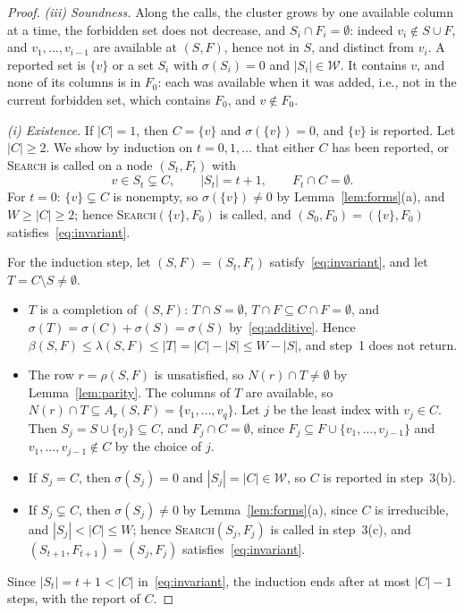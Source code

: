 \documentclass[11pt]{article}
\theoremstyle{definition}
\newcommand{\Wr}{\mathcal{W}}   %
\begin{document}
\begin{proof}
\emph{(iii) Soundness.} Along the calls, the cluster grows by one available column at a time, the forbidden set does
not decrease, and $S_i\cap F_i=\emptyset$: indeed $v_i\notin S\cup F$, and $v_1,\dots,v_{i-1}$ are available at
$(S,F)$, hence not in $S$, and distinct from $v_i$. A reported set is $\{v\}$ or a set $S_i$ with $\sigma(S_i)=0$ and
$|S_i|\in\Wr$. It contains $v$, and none of its columns is in $F_0$: each was available when it was added, i.e., not
in the current forbidden set, which contains $F_0$, and $v\notin F_0$.

\emph{(i) Existence.} If $|C|=1$, then $C=\{v\}$ and $\sigma(\{v\})=0$, and $\{v\}$ is reported. Let $|C|\ge2$. We
show by induction on $t=0,1,\dots$ that either $C$ has been reported, or \textup{\textsc{Search}} is called on a node
$(S_t,F_t)$ with
\begin{equation}\label{eq:invariant}
  v\in S_t\subsetneq C,\qquad |S_t|=t+1,\qquad F_t\cap C=\emptyset .
\end{equation}
For $t=0$: $\{v\}\subsetneq C$ is nonempty, so $\sigma(\{v\})\neq0$ by Lemma~\ref{lem:forms}(a), and $W\ge|C|\ge2$;
hence \textup{\textsc{Search}}$(\{v\},F_0)$ is called, and $(S_0,F_0)=(\{v\},F_0)$ satisfies~\eqref{eq:invariant}.

For the induction step, let $(S,F)=(S_t,F_t)$ satisfy~\eqref{eq:invariant}, and let $T=C\setminus S\neq\emptyset$.
\begin{itemize}
  \item $T$ is a completion of $(S,F)$: $T\cap S=\emptyset$, $T\cap F\subseteq C\cap F=\emptyset$, and
    $\sigma(T)=\sigma(C)+\sigma(S)=\sigma(S)$ by~\eqref{eq:additive}. Hence
    $\beta(S,F)\le\lambda(S,F)\le|T|=|C|-|S|\le W-|S|$, and step~1 does not return.
  \item The row $r=\rho(S,F)$ is unsatisfied, so $N(r)\cap T\neq\emptyset$ by Lemma~\ref{lem:parity}. The columns of
    $T$ are available, so $N(r)\cap T\subseteq A_r(S,F)=\{v_1,\dots,v_q\}$. Let $j$ be the least index with $v_j\in C$.
    Then $S_j=S\cup\{v_j\}\subseteq C$, and $F_j\cap C=\emptyset$, since $F_j\subseteq F\cup\{v_1,\dots,v_{j-1}\}$ and
    $v_1,\dots,v_{j-1}\notin C$ by the choice of $j$.
  \item If $S_j=C$, then $\sigma(S_j)=0$ and $|S_j|=|C|\in\Wr$, so $C$ is reported in step~3(b).
  \item If $S_j\subsetneq C$, then $\sigma(S_j)\neq0$ by Lemma~\ref{lem:forms}(a), since $C$ is irreducible, and
    $|S_j|<|C|\le W$; hence \textup{\textsc{Search}}$(S_j,F_j)$ is called in step~3(c), and
    $(S_{t+1},F_{t+1})=(S_j,F_j)$ satisfies~\eqref{eq:invariant}.
\end{itemize}
Since $|S_t|=t+1<|C|$ in~\eqref{eq:invariant}, the induction ends after at most $|C|-1$ steps, with the report of $C$.


\end{proof}
\end{document}
